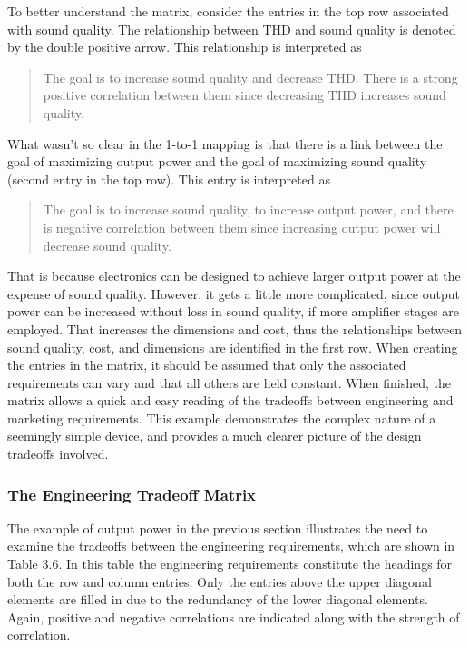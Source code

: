 To better understand the matrix, consider the entries in the top row
associated with sound quality. The relationship between THD and sound
quality is denoted by the double positive arrow. This relationship is
interpreted as

\begin{quote}
The goal is to increase sound quality and decrease THD. There is a
strong positive correlation between them since decreasing THD increases
sound quality.
\end{quote}

What wasn't so clear in the 1-to-1 mapping is that there is a link
between the goal of maximizing output power and the goal of maximizing
sound quality (second entry in the top row). This entry is interpreted
as

\begin{quote}
The goal is to increase sound quality, to increase output power, and
there is negative correlation between them since increasing output power
will decrease sound quality.
\end{quote}

That is because electronics can be designed to achieve larger output
power at the expense of sound quality. However, it gets a little more
complicated, since output power can be increased without loss in sound
quality, if more amplifier stages are employed. That increases the
dimensions and cost, thus the relationships between sound quality, cost,
and dimensions are identified in the first row. When creating the
entries in the matrix, it should be assumed that only the associated
requirements can vary and that all others are held constant. When
finished, the matrix allows a quick and easy reading of the tradeoffs
between engineering and marketing requirements. This example
demonstrates the complex nature of a seemingly simple device, and
provides a much clearer picture of the design tradeoffs involved.

\subsubsection{The Engineering Tradeoff
Matrix}\label{the-engineering-tradeoff-matrix}

The example of output power in the previous section illustrates the need
to examine the tradeoffs between the engineering requirements, which are
shown in Table 3.6. In this table the engineering requirements
constitute the headings for both the row and column entries. Only the
entries above the upper diagonal elements are filled in due to the
redundancy of the lower diagonal elements. Again, positive and negative
correlations are indicated along with the strength of correlation.

